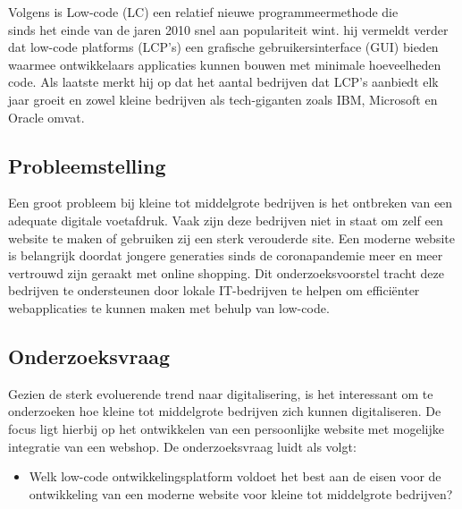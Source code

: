 \vspace{\baselineskip}

Volgens \textcite{bock2021low} is Low-code (LC) een relatief nieuwe programmeermethode die \\sinds het einde van de jaren 2010 snel aan populariteit wint. hij vermeldt verder dat low-code platforms (LCP’s) een grafische gebruikersinterface (GUI) bieden waarmee ontwikkelaars applicaties kunnen bouwen met minimale hoeveelheden code. Als laatste merkt hij op dat het aantal bedrijven dat LCP's aanbiedt elk jaar groeit en zowel kleine bedrijven als tech-giganten zoals IBM, Microsoft en Oracle omvat.

\subsection{Probleemstelling}
\label{sec:Probleemstelling}

Een groot probleem bij kleine tot middelgrote bedrijven is het ontbreken van een adequate digitale voetafdruk. Vaak zijn deze bedrijven niet in staat om zelf een website te maken of gebruiken zij een sterk verouderde site. Een moderne website is belangrijk doordat jongere generaties sinds de coronapandemie meer en meer vertrouwd zijn geraakt met online shopping. Dit onderzoeksvoorstel tracht deze bedrijven te ondersteunen door lokale IT-bedrijven te helpen om efficiënter webapplicaties te kunnen maken met behulp van low-code.

\subsection{Onderzoeksvraag}
\label{sec:Onderzoeksvraag}

Gezien de sterk evoluerende trend naar digitalisering, is het interessant om te onderzoeken hoe kleine tot middelgrote bedrijven zich kunnen digitaliseren. De focus ligt hierbij op het ontwikkelen van een persoonlijke website met mogelijke integratie van een webshop. De onderzoeksvraag luidt als volgt: 
 
\vspace{\baselineskip}

\begin{itemize}
  \item Welk low-code ontwikkelingsplatform voldoet het best aan de eisen voor de ontwikkeling van een moderne website voor kleine tot middelgrote bedrijven?
\end{itemize}


